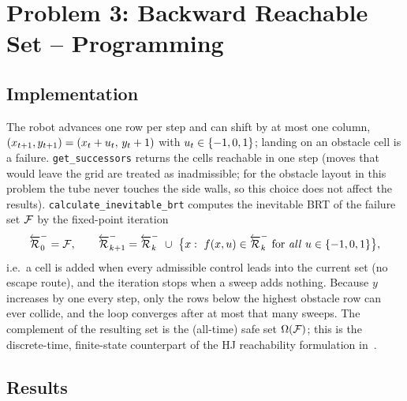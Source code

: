 
\section*{Problem 3: Backward Reachable Set -- Programming}

\subsection*{Implementation}

The robot advances one row per step and can shift by at most one column,
$(x_{{t}+1},y_{{t}+1})=(x_{t}+{u}_{t},\,y_{t}+1)$ with ${u}_{t}\in\{-1,0,1\}$;
landing on an obstacle cell is a failure. \lstinline{get_successors} returns the cells reachable in
one step (moves that would leave the grid are treated as inadmissible; for the obstacle layout in
this problem the tube never touches the side walls, so this choice does not affect the results).
\lstinline{calculate_inevitable_brt} computes the inevitable BRT of the failure set ${\mathcal{F}}$ by
the fixed-point iteration
\[
\inevitable{\backward{\reach}}_{0}=\failure,\qquad
\inevitable{\backward{\reach}}_{k+1}=\inevitable{\backward{\reach}}_{k}\ \cup\
\bigl\{\state:\ \dyn(\state,\ctrl)\in\inevitable{\backward{\reach}}_{k}\ \text{for \emph{all}}\ \ctrl\in\{-1,0,1\}\bigr\},
\]
i.e.\ a cell is added when every admissible control leads into the current set (no escape route),
and the iteration stops when a sweep adds nothing. Because $y$ increases by one every step, only the
rows below the highest obstacle row can ever collide, and the loop converges after at most that many
sweeps. The complement of the resulting set is the (all-time) safe set ${\Omega}({\mathcal{F}})$; this is
the discrete-time, finite-state counterpart of the HJ reachability formulation
in~\cite{bansal2017hamilton}.




\subsection*{Results}


